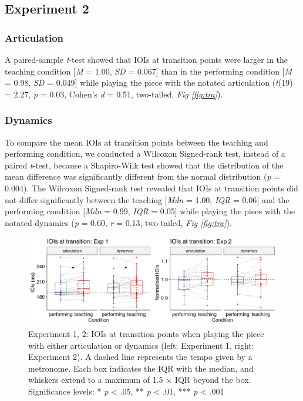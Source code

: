 \documentclass[
  man,floatsintext]{apa6}
\begin{document}
\hypertarget{experiment-2-4}{%
\subsection{Experiment 2}\label{experiment-2-4}}

\hypertarget{articulation-5}{%
\subsubsection{Articulation}\label{articulation-5}}

A paired-sample \emph{t}-test showed that IOIs at transition points were larger in the teaching condition {[}\emph{M} = 1.00, \emph{SD} = 0.067{]} than in the performing condition {[}\emph{M} = 0.98, \emph{SD} = 0.049{]} while playing the piece with the notated articulation (\emph{t}(19) = 2.27, \emph{p} = 0.03, Cohen's \emph{d} = 0.51, two-tailed, \emph{Fig \ref{fig:tra}}).

\hypertarget{dynamics-5}{%
\subsubsection{Dynamics}\label{dynamics-5}}

To compare the mean IOIs at transition points between the teaching and performing condition, we conducted a Wilcoxon Signed-rank test, instead of a paired \emph{t}-test, because a Shapiro-Wilk test showed that the distribution of the mean difference was significantly different from the normal distribution (\emph{p} = 0.004). The Wilcoxon Signed-rank test revealed that IOIs at transition points did not differ significantly between the teaching {[}\emph{Mdn} = 1.00, \emph{IQR} = 0.06{]} and the performing condition {[}\emph{Mdn} = 0.99, \emph{IQR} = 0.05{]} while playing the piece with the notated dynamics (\emph{p} = 0.60, \emph{r} = 0.13, two-tailed, \emph{Fig \ref{fig:tra}}).

\begin{figure}
\includegraphics[width=1\linewidth]{manuscript_files/figure-latex/plot-tra-1} \caption{\label{fig:tra}Experiment 1, 2: IOIs at transition points when playing the piece with either articulation or dynamics (left: Experiment 1, right: Experiment 2). A dashed line represents the tempo given by a metronome. Each box indicates the IQR with the median, and whiskers extend to a maximum of 1.5 × IQR beyond the box. Significance levels: * \textit{p} < .05, ** \textit{p} < .01, *** \textit{p} < .001}\label{fig:plot-tra}
\end{figure}
\end{document}
